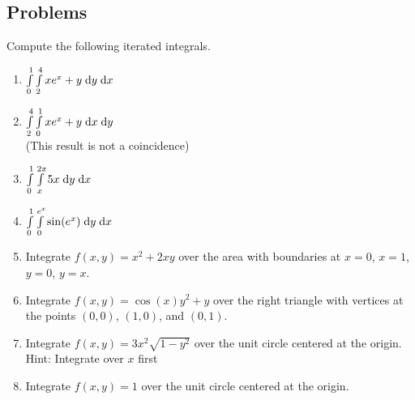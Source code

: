\documentclass[letterpaper,11pt]{article}
\begin{document}
  \subsection*{Problems}
  Compute the following iterated integrals.

  \begin{enumerate}
    \item $\int \limits_{0}^{1} \int \limits_{2}^{4} x e^{x} + y \;\mathrm{d}y \;\mathrm{d}x$\\
      \newline
      \newline
    \item $\int \limits_{2}^{4} \int \limits_{0}^{1} x e^{x} + y \;\mathrm{d}x \;\mathrm{d}y$\\
      (This result is not a coincidence)\\
      \newline
      \newline
    \item $\int \limits_{0}^{1} \int \limits_{x}^{2 x} 5 x \;\mathrm{d}y \;\mathrm{d}x$\\
      \newline
      \newline
    \item $\int \limits_{0}^{1} \int \limits_{0}^{e^{x}} \sin(e^x) \;\mathrm{d}y \;\mathrm{d}x$\\
      \newline
      \newline
    \item Integrate $f(x, y) = x^2 + 2 x y$ over the area with boundaries at $x = 0$, $x = 1$, $y = 0$, $y = x$.\\
      \newline
      \newline
    \item Integrate $f(x, y) = \cos(x) y^{2} + y$ over the right triangle with vertices at the points $(0, 0)$, $(1, 0)$, and $(0, 1)$.\\
      \newline
      \newline
    \item Integrate $f(x, y) = 3 x^2 \sqrt{1 - y^2}$ over the unit circle centered at the origin.\\
      Hint: Integrate over $x$ first\\
      \newline
      \newline
    \item Integrate $f(x, y) = 1$ over the unit circle centered at the origin.\\

\end{enumerate}
\end{document}
